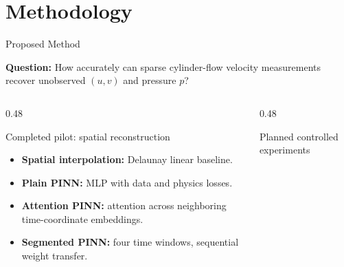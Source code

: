 \documentclass[12pt]{beamer}
\begin{document}

\section{Methodology}


\begin{frame}{Proposed Method}

\small

\textbf{Question:} How accurately can sparse cylinder-flow velocity measurements recover unobserved $(u,v)$ and pressure $p$?

\vspace{0.35cm}

\begin{columns}[T,onlytextwidth]

  \begin{column}{0.48\textwidth}

    \begin{block}{Completed pilot: spatial reconstruction}

      \begin{itemize}\setlength{\itemsep}{0.21cm}

        \item \textbf{Spatial interpolation:} Delaunay linear baseline.

        \item \textbf{Plain PINN:} MLP with data and physics losses.

        \item \textbf{Attention PINN:} attention across neighboring time-coordinate embeddings.

        \item \textbf{Segmented PINN:} four time windows, sequential weight transfer.

      \end{itemize}

    \end{block}

  \end{column}

  \begin{column}{0.48\textwidth}

    \begin{block}{Planned controlled experiments}

      \begin{itemize}\setlength{\itemsep}{0.21cm}


\end{itemize}
\end{block}
\end{column}
\end{columns}
\end{frame}
\end{document}
